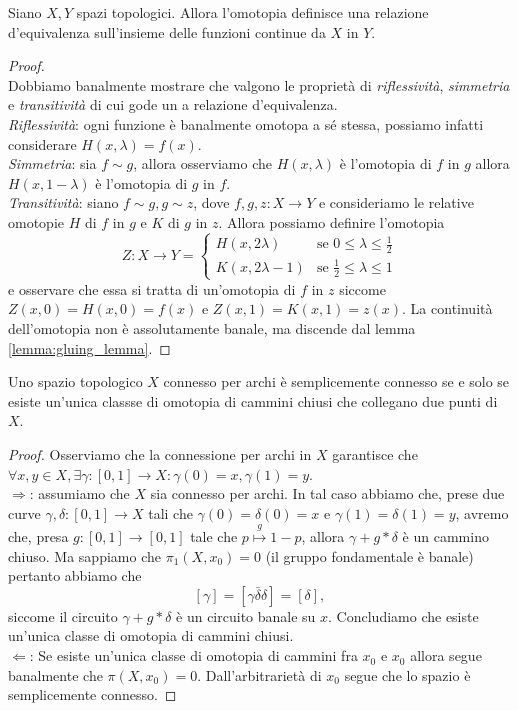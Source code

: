 \begin{prop}
    Siano $X, Y$ spazi topologici. Allora l'omotopia definisce una relazione d'equivalenza sull'insieme delle funzioni continue da $X$ in $Y$.
\end{prop}
\begin{proof} \hspace{1cm} \\
    Dobbiamo banalmente mostrare che valgono le proprietà di \emph{riflessività}, \emph{simmetria} e \emph{transitività} di cui gode un a relazione d'equivalenza. \\
    \emph{Riflessività}: ogni funzione è banalmente omotopa a sé stessa, possiamo infatti considerare $H(x, \lambda) = f(x)$. \\
    \emph{Simmetria}: sia $f \sim g$, allora osserviamo che $H(x, \lambda)$ è l'omotopia di $f$ in $g$ allora $H(x, 1-\lambda)$ è l'omotopia di $g$ in $f$. \\
    \emph{Transitività}: siano $f \sim g, g \sim z$, dove $f, g, z : X \to Y$ e consideriamo le relative omotopie $H$ di $f$ in $g$ e $K$ di $g$ in $z$. Allora possiamo definire l'omotopia
    $$
        Z: X \to Y = \begin{cases}
            H(x, 2\lambda) & \text{se } 0 \leq \lambda \leq \frac{1}{2} \\
            K(x, 2\lambda - 1) & \text{se } \frac{1}{2} \leq \lambda \leq 1
        \end{cases}
    $$
    e osservare che essa si tratta di un'omotopia di $f$ in $z$ siccome $Z(x, 0) = H(x, 0) = f(x)$ e $Z(x, 1) = K(x, 1) = z(x)$. La continuità dell'omotopia non è assolutamente banale, ma discende dal lemma \ref{lemma:gluing_lemma}.
\end{proof}
\begin{prop}
    Uno spazio topologico $X$ connesso per archi è semplicemente connesso se e solo se esiste un'unica classse di omotopia di cammini chiusi che collegano due punti di $X$.
\end{prop}
\begin{proof}
    Osserviamo che la connessione per archi in $X$ garantisce che $\forall x, y \in X, \exists \gamma: [0, 1] \to X : \gamma(0) = x, \gamma(1) = y$. \\
    $\boxed{\Rightarrow}$: assumiamo che $X$ sia connesso per archi. In tal caso abbiamo che, prese due curve $\gamma, \delta : [0, 1] \to X$ tali che $\gamma(0) = \delta(0) = x$ e $\gamma(1) = \delta(1) = y$, avremo che,
    presa $g : [0, 1] \to [0, 1]$ tale che $p \stackrel{g}{\mapsto} 1 - p$, allora $\gamma + g*\delta$ è un cammino chiuso. Ma sappiamo che $\pi_1(X, x_0) = 0$ (il gruppo fondamentale è banale) pertanto abbiamo che
    $$
    [\gamma] = [\gamma \bar{\delta} \delta] = [\delta],
    $$
    siccome il circuito $\gamma + g*\delta$ è un circuito banale su $x$. Concludiamo che esiste un'unica classe di omotopia di cammini chiusi. \\
    $\boxed{\Leftarrow}$: Se esiste un'unica classe di omotopia di cammini fra $x_0$ e $x_0$ allora segue banalmente che $\pi(X, x_0) = 0$. Dall'arbitrarietà di $x_0$ segue che lo spazio è semplicemente connesso. 
\end{proof}